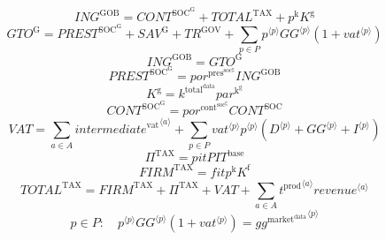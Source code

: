 \begin{equation}
{I\!N\!G}^{\mathrm{GOB}} = {C\!O\!N\!T}^{\mathrm{SOC}^{\mathrm{G}}} + {T\!O\!T\!A\!L}^{\mathrm{TAX}} + {p^{\mathrm{k}}} {K^{\mathrm{g}}}
\end{equation}
\begin{equation}
{G\!T\!O}^{\mathrm{G}} = {P\!R\!E\!S\!T}^{\mathrm{SOC}^{\mathrm{G}}} + {S\!A\!V}^{\mathrm{G}} + {T\!R}^{\mathrm{GOV}} + \sum_{p\in P} {{p}^{\langle p\rangle}} {{{G\!G}}^{\langle p\rangle}} \left(1 + {{v\!a\!t}}^{\langle p\rangle}\right)
\end{equation}
\begin{equation}
{I\!N\!G}^{\mathrm{GOB}} = {G\!T\!O}^{\mathrm{G}}
\end{equation}
\begin{equation}
{P\!R\!E\!S\!T}^{\mathrm{SOC}^{\mathrm{G}}} = {{p\!o\!r}^{\mathrm{pres}^{\mathrm{soc}^{\mathrm{g}}}}} {{I\!N\!G}^{\mathrm{GOB}}}
\end{equation}
\begin{equation}
K^{\mathrm{g}} = {k^{\mathrm{total}^{\mathrm{data}}}} {{p\!a\!r}^{\mathrm{k}^{\mathrm{g}}}}
\end{equation}
\begin{equation}
{C\!O\!N\!T}^{\mathrm{SOC}^{\mathrm{G}}} = {{p\!o\!r}^{\mathrm{cont}^{\mathrm{soc}^{\mathrm{g}}}}} {{C\!O\!N\!T}^{\mathrm{SOC}}}
\end{equation}
\begin{equation}
{V\!A\!T} = \sum_{a\in A} {{i\!n\!t\!e\!r\!m\!e\!d\!i\!a\!t\!e}^{\mathrm{vat}}}^{\langle a\rangle} + \sum_{p\in P} {{{v\!a\!t}}^{\langle p\rangle}} {{p}^{\langle p\rangle}} \left({D}^{\langle p\rangle} + {{G\!G}}^{\langle p\rangle} + {I}^{\langle p\rangle}\right)
\end{equation}
\begin{equation}
\Pi^{\mathrm{TAX}} = {{p\!i\!t}} {{P\!I\!T}^{\mathrm{base}}}
\end{equation}
\begin{equation}
{F\!I\!R\!M}^{\mathrm{TAX}} = {{f\!i\!t}} {p^{\mathrm{k}}} {K^{\mathrm{f}}}
\end{equation}
\begin{equation}
{T\!O\!T\!A\!L}^{\mathrm{TAX}} = {F\!I\!R\!M}^{\mathrm{TAX}} + \Pi^{\mathrm{TAX}} + {V\!A\!T} + \sum_{a\in A} {{t^{\mathrm{prod}}}^{\langle a\rangle}} {{{r\!e\!v\!e\!n\!u\!e}}^{\langle a\rangle}}
\end{equation}
\begin{equation}
p\in P\colon\quad {{p}^{\langle p\rangle}} {{{G\!G}}^{\langle p\rangle}} \left(1 + {{v\!a\!t}}^{\langle p\rangle}\right) = {{g\!g}^{\mathrm{market}^{\mathrm{data}}}}^{\langle p\rangle}
\end{equation}




